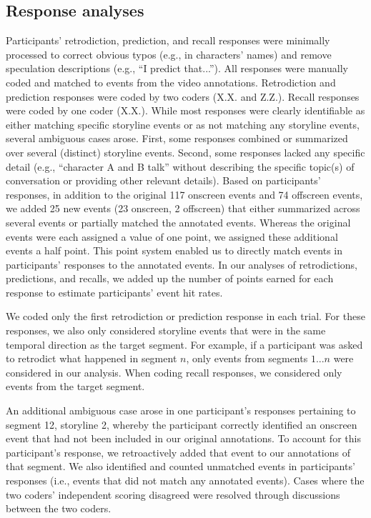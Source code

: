 \documentclass[10pt]{article}
\begin{document}
\subsection*{Response analyses}
Participants' retrodiction, prediction, and recall responses were minimally processed to correct obvious typos (e.g., in characters’ names) and remove speculation descriptions (e.g., ``I predict that...'').  All responses were manually coded and matched to events from the video annotations. Retrodiction and prediction responses were coded by two coders (X.X. and Z.Z.). Recall responses were coded by one coder (X.X.).  While most responses were clearly identifiable as either matching specific storyline events or as not matching any storyline events, several ambiguous cases arose.  First, some responses combined or summarized over several (distinct) storyline events.  Second, some responses lacked any specific detail (e.g., ``character A and B talk'' without describing the specific topic(s) of conversation or providing other relevant details).  Based on participants' responses, in addition to the original 117 onscreen events and 74 offscreen events, we added 25 new events (23 onscreen, 2 offscreen) that either summarized across several events or partially matched the annotated events.  Whereas the original events were each assigned a value of one point, we assigned these additional events a half point.  This point system enabled us to directly match events in participants' responses to the annotated events.  In our analyses of retrodictions, predictions, and recalls, we added up the number of points earned for each response to estimate participants' event hit rates.

We coded only the first retrodiction or prediction response in each trial.  For these responses, we also only considered storyline events that were in the same temporal direction as the target segment.  For example, if a participant was asked to retrodict what happened in segment $n$, only events from segments $1...n$ were considered in our analysis.  When coding recall responses, we considered only events from the target segment.  

An additional ambiguous case arose in one participant's responses pertaining to segment 12, storyline 2, whereby the participant correctly identified an onscreen event that had not been included in our original annotations.  To account for this participant's response, we retroactively added that event to our annotations of that segment.  We also identified and counted unmatched events in participants' responses (i.e., events that did not match any annotated events).  Cases where the two coders' independent scoring disagreed were resolved through discussions between the two coders.
\end{document}

